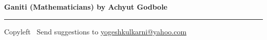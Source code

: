 % 


\usepackage{beamerarticle} %
\usepackage{tikz-qtree}


\raggedright
\footnotesize


\begin{center}
     \Large{\textbf{Ganiti (Mathematicians) by Achyut Godbole}}  %
\end{center}


\begin{multicols}{3}

\end{multicols}

\rule{\linewidth}{0.25pt}
\scriptsize
Copyleft \textcopyleft\  Send suggestions to 
\href{http://www.yogeshkulkarni.com}{yogeshkulkarni@yahoo.com}



